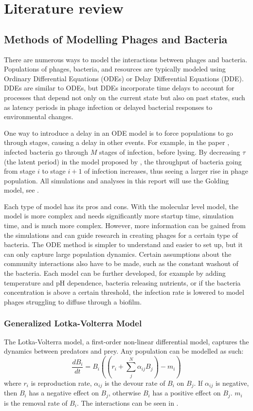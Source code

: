 \chapter{Literature review}
\label{LR}

\section{Methods of Modelling Phages and Bacteria}
There are numerous ways to model the interactions between phages and bacteria.
Populations of phages, bacteria, and resources are typically modeled using Ordinary Differential Equations (ODEs) or Delay Differential Equations (DDE). 
DDEs are similar to ODEs, but DDEs incorporate time delays to account for processes that depend not only on the current state but also on past states, such as latency periods in phage infection or delayed bacterial responses to environmental changes.

One way to introduce a delay in an ODE model is to force populations to go through stages, causing a delay in other events. 
For example, in the paper \citet{gengUsingBacterialPopulation2024}, infected bacteria go through $M$ stages of infection, before lysing. 
By decreasing $\tau$ (the latent period) in the model proposed by \citet{gengUsingBacterialPopulation2024}, the throughput of bacteria going from stage $i$ to stage $i+1$ of infection increases, thus seeing a larger rise in phage population. 
All simulations and analyses in this report will use the Golding model, see . 

Each type of model has its pros and cons.
With the molecular level model, the model is more complex and needs significantly more startup time, simulation time, and is much more complex.
However, more information can be gained from the simulations and can guide research in creating phages for a certain type of bacteria.
The ODE method is simpler to understand and easier to set up, but it can only capture large population dynamics.
Certain assumptions about the community interactions also have to be made, such as the constant washout of the bacteria. 
Each model can be further developed, for example by adding temperature and pH dependence, bacteria releasing nutrients, or if the bacteria concentration is above a certain threshold, the infection rate is lowered to model phages struggling to diffuse through a biofilm. 

\subsection{Generalized Lotka-Volterra Model}
The Lotka-Volterra model, a first-order non-linear differential model, captures the dynamics between predators and prey.
Any population can be modelled as such:
\[ 
    \frac{d{B}_i}{dt} = {B}_i \left(\left(r_i + \sum_{j}^{N} \alpha_{ij}{B}_j \right) - m_i\right)
\]
where $r_i$ is reproduction rate, $\alpha_{ij}$ is the devour rate of $B_i$ on $B_j$. If $\alpha_{ij}$ is negative, then $B_i$ has a negative effect on $B_j$, otherwise $B_i$ has a positive effect on $B_j$. $m_i$ is the removal rate of $B_i$. 
The interactions can be seen in . 

